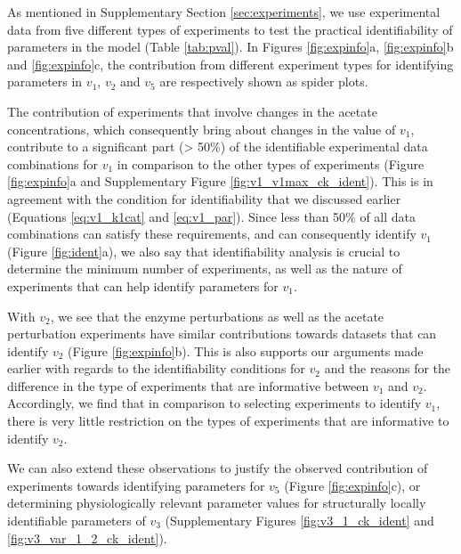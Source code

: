 \documentclass[10pt]{article}
\begin{document}
	As mentioned in Supplementary Section \ref{sec:experiments}, we use experimental data from five different types of experiments to test the practical identifiability of parameters in the model (Table \ref{tab:pval}). In Figures \ref{fig:expinfo}a, \ref{fig:expinfo}b and \ref{fig:expinfo}c, the contribution from different experiment types for identifying parameters in $v_1$, $v_2$ and $v_5$ are respectively shown as spider plots. 
	
	The contribution of experiments that involve changes in the acetate concentrations, which consequently bring about changes in the value of $v_1$, contribute to a significant part (> 50\%) of the identifiable experimental data combinations for $v_1$ in comparison to the other types of experiments (Figure \ref{fig:expinfo}a and Supplementary Figure \ref{fig:v1_v1max_ck_ident}). This is in agreement with the condition for identifiability that we discussed earlier (Equations \ref{eq:v1_k1cat} and \ref{eq:v1_par}). Since less than 50\% of all data combinations can satisfy these requirements, and can consequently identify $v_1$ (Figure \ref{fig:ident}a), we also say that identifiability analysis is crucial to determine the minimum number of experiments, as well as the nature of experiments that can help identify parameters for $v_1$. 
	
	With $v_2$, we see that the enzyme perturbations as well as the acetate perturbation experiments have similar contributions towards datasets that can identify $v_2$ (Figure \ref{fig:expinfo}b). This is also supports our arguments made earlier with regards to the identifiability conditions for $v_2$ and the reasons for the difference in the type of experiments that are informative between $v_1$ and $v_2$. Accordingly, we find that in comparison to selecting experiments to identify $v_1$, there is very little restriction on the types of experiments that are informative to identify $v_2$.
	
	We can also extend these observations to justify the observed contribution of experiments towards identifying parameters for $v_5$ (Figure \ref{fig:expinfo}c), or determining physiologically relevant parameter values for structurally locally identifiable parameters of $v_3$ (Supplementary Figures \ref{fig:v3_1_ck_ident} and \ref{fig:v3_var_1_2_ck_ident}). 
	
\end{document}

